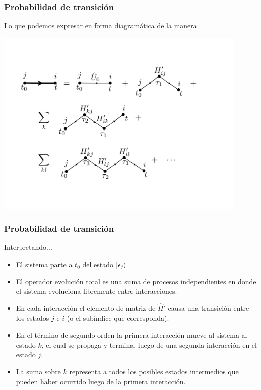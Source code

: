 \documentclass{beamer}
\begin{document}
\begin{frame}
    \frametitle{Probabilidad de transición}
    Lo que podemos expresar en forma diagramática de la manera
    \begin{center}
        \includegraphics[width=12cm]{figs/dyson2.pdf} 
    \end{center}
\end{frame}

\begin{frame}
    \frametitle{Probabilidad de transición}
    Interpretando...
    \begin{itemize}
        \item El sistema parte a $t_0$ del estado $| \epsilon_j \rangle$
        \item El operador evolución total es una suma de procesos independientes en donde el sistema evoluciona libremente entre interacciones.
        \item En cada interacción el elemento de matriz de $\hat{H}'$ causa una transición entre los estados $j$ e $i$ (o el subíndice que corresponda).
        \item En el término de segundo orden la primera interacción mueve al sistema al estado $k$, el cual se propaga y termina, luego de una segunda interacción en el estado $j$.
        \item La suma sobre $k$ representa a todos los posibles estados intermedios que pueden haber ocurrido luego de la primera interacción.
    \end{itemize}
\end{frame}
\end{document}
